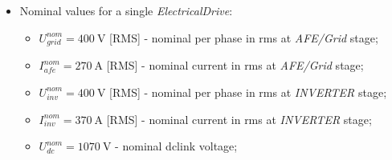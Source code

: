 \documentclass[12pt,a4paper]{scrartcl}
\begin{document}
\begin{onehalfspace}
\begin{itemize}
\begin{itemize}
		\item[--] $\vec{u}_s^{\,uvw}\Big|_n(t)\quad\Big[\SI{}{\ampere}\Big]$: phase to ground INVERTER output voltage of the \textit{ElectricalDrive} number \textit{n};	
		\item[--] $u_{dc}\Big|_n(t)\quad\Big[\SI{}{\volt}\Big]$: DC-link voltage of the \textit{ElectricalDrive} number \textit{n};		
		\item[--] $L_{Fu}\Big|_p\quad\Big[\SI{}{\henry}\Big]$: grid output filter inductance (positive sequence);
		\item[--] $L_{Fu}\Big|_0\quad\Big[\SI{}{\henry}\Big]$: grid output filter inductance (zero sequence);
		\item[--] $C_{Fu}\quad\Big[\SI{}{\farad}\Big]$: grid output filter capacitor (per phase - start connection);		
		\item[--] $R_{Fu}\quad\Big[\SI{}{\farad}\Big]$: grid output filter damping resistor (per phase - star connection);
		\item[--] $L_{Fi}\Big|_p\quad\Big[\SI{}{\henry}\Big]$: inverter output $dv/dt$ inductance filter (positive sequence);
		\item[--] $L_{Fi}\Big|_0\quad\Big[\SI{}{\henry}\Big]$: inverter output $dv/dt$ inductance filter (zero sequence);
		\item[--] the total residual current distortion is $\textit{THD}_i$: total harmonic current distortion;
		\item[--] $h$: harmonic order;
		\item[--] \textit{stack}: the term \textit{stack} is used to reference quantities which are close or belong to the semiconductor components;
	\end{itemize}
	\item[--] Nominal values for a single \textit{ElectricalDrive}:
	\begin{itemize}
		\item[--] $U_{grid}^{nom} = \SI{400}{\volt}$ [RMS] - nominal per phase in rms at \textit{AFE/Grid} stage;		
		\item[--] $I_{afe}^{nom} = \SI{270}{\ampere}$ [RMS] - nominal current in rms at \textit{AFE/Grid} stage;		
		\item[--] $U_{inv}^{nom} = \SI{400}{\volt}$ [RMS] - nominal per phase in rms at \textit{INVERTER} stage;				\item[--] $I_{inv}^{nom} = \SI{370}{\ampere}$ [RMS] - nominal current in rms at \textit{INVERTER} stage;
		\item[--] $U_{dc}^{nom} = \SI{1070}{\volt}$ - nominal dclink voltage;

\end{itemize}
\end{itemize}
\end{onehalfspace}
\end{document}
